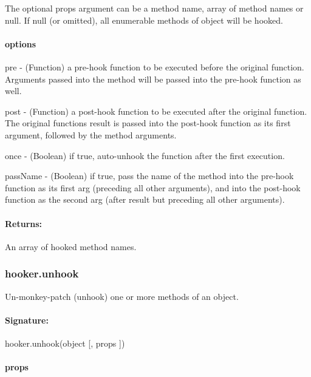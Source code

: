 The optional {\ttfamily props} argument can be a method name, array of method names or null. If null (or omitted), all enumerable methods of {\ttfamily object} will be hooked. \paragraph*{{\ttfamily options}}


\begin{DoxyItemize}
\item {\ttfamily pre} -\/ (Function) a pre-\/hook function to be executed before the original function. Arguments passed into the method will be passed into the pre-\/hook function as well.
\item {\ttfamily post} -\/ (Function) a post-\/hook function to be executed after the original function. The original function\textquotesingle{}s result is passed into the post-\/hook function as its first argument, followed by the method arguments.
\item {\ttfamily once} -\/ (Boolean) if true, auto-\/unhook the function after the first execution.
\item {\ttfamily pass\+Name} -\/ (Boolean) if true, pass the name of the method into the pre-\/hook function as its first arg (preceding all other arguments), and into the post-\/hook function as the second arg (after result but preceding all other arguments).
\end{DoxyItemize}

\paragraph*{Returns\+:}

An array of hooked method names.

\subsubsection*{hooker.\+unhook}

Un-\/monkey-\/patch (unhook) one or more methods of an object. \paragraph*{Signature\+:}

{\ttfamily hooker.\+unhook(object \mbox{[}, props \mbox{]})} \paragraph*{{\ttfamily props}}

